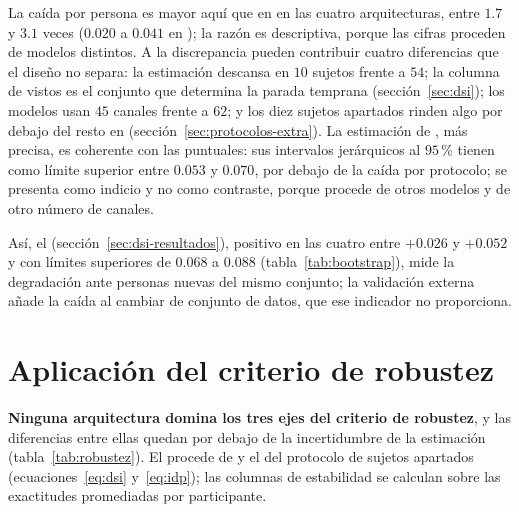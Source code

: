 La caída por persona es mayor aquí que en \loso{} en las cuatro arquitecturas, entre $1.7$ y $3.1$ veces
($0.020$ a $0.041$ en \loso{}); la razón es descriptiva, porque las cifras proceden de modelos distintos. A
la discrepancia pueden contribuir cuatro diferencias que el diseño no separa: la estimación descansa en $10$
sujetos frente a $54$; la columna de vistos es el conjunto que determina la parada temprana
(sección~\ref{sec:dsi}); los modelos usan $45$ canales frente a $62$; y los diez sujetos apartados rinden
algo por debajo del resto en \loso{} (sección~\ref{sec:protocolos-extra}). La estimación de \loso{}, más
precisa, es coherente con las puntuales: sus intervalos jerárquicos al $95$\,\% tienen como límite superior
entre $0.053$ y $0.070$, por debajo de la caída por protocolo; se presenta como indicio y no como contraste,
porque procede de otros modelos y de otro número de canales.

Así, el \dsi{} (sección~\ref{sec:dsi-resultados}), positivo en las cuatro entre $+0.026$ y $+0.052$ y con
límites superiores de $0.068$ a $0.088$ (tabla~\ref{tab:bootstrap}), mide la degradación ante personas nuevas del mismo conjunto; la validación
externa añade la caída al cambiar de conjunto de datos, que ese indicador no proporciona.

\section{Aplicación del criterio de robustez}
\label{sec:aplicacion-robustez}

\textbf{Ninguna arquitectura domina los tres ejes del criterio de robustez}, y las diferencias entre ellas
quedan por debajo de la incertidumbre de la estimación (tabla~\ref{tab:robustez}). El \dsi{} procede de
\loso{} y el \idp{} del protocolo de sujetos apartados (ecuaciones~\eqref{eq:dsi} y~\eqref{eq:idp});
las columnas de estabilidad se calculan sobre las exactitudes \loso{} promediadas por participante.

